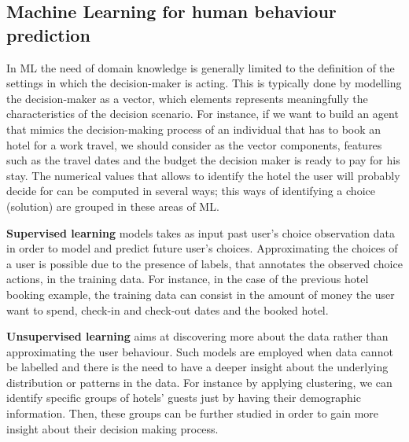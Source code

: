 \subsection{Machine Learning for human behaviour prediction}
In ML the need of domain knowledge is generally limited to the definition of the settings in which the decision-maker is acting. This is typically done by modelling the decision-maker as a vector, 
which elements  represents meaningfully the characteristics of the decision scenario. For instance, if we want to build an agent that mimics the decision-making process of an individual that has to book an hotel for a work travel,
we should consider as the vector components, features such as the travel dates and the budget the decision maker is ready to pay for his stay. The numerical values that allows to identify the hotel the user will probably decide for can be computed in several ways; this ways of identifying a choice (solution) are grouped in these areas of ML.
\newline


\noindent\textbf{Supervised learning} \cite{Russell:2009:AIM:1671238} models takes as input past user's choice observation data in order to model and predict future user's choices.
Approximating the choices of a user is possible due to the presence of labels, that annotates the observed choice actions, in the training data. For instance, in the case of the previous hotel booking example, the training data can consist in the amount of money the user want to spend, check-in and check-out dates and the booked hotel. \newline

\noindent\textbf{Unsupervised learning} \cite{unsupervised:Hinton1999} aims at discovering more about the data rather than approximating the user behaviour. Such models are employed when data cannot be labelled and there is the need to have a deeper insight about the underlying distribution or patterns in the data. For instance by applying clustering, we can identify specific groups of hotels' guests just by having their demographic information. Then, these groups can be further studied in order to gain more insight about their decision making process. \newline


